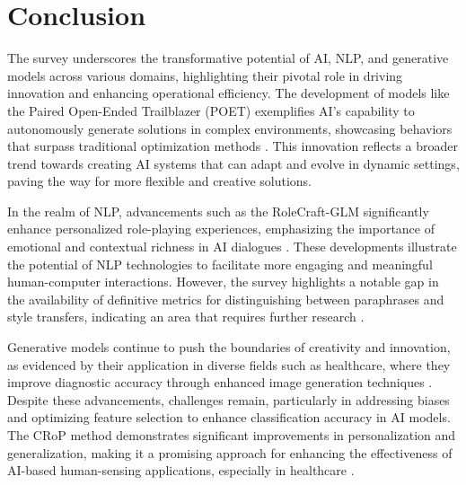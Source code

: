 \section{Conclusion} \label{sec:Conclusion}





The survey underscores the transformative potential of AI, NLP, and generative models across various domains, highlighting their pivotal role in driving innovation and enhancing operational efficiency. The development of models like the Paired Open-Ended Trailblazer (POET) exemplifies AI's capability to autonomously generate solutions in complex environments, showcasing behaviors that surpass traditional optimization methods \cite{wang2019pairedopenendedtrailblazerpoet}. This innovation reflects a broader trend towards creating AI systems that can adapt and evolve in dynamic settings, paving the way for more flexible and creative solutions.



In the realm of NLP, advancements such as the RoleCraft-GLM significantly enhance personalized role-playing experiences, emphasizing the importance of emotional and contextual richness in AI dialogues \cite{tao2024rolecraftglmadvancingpersonalizedroleplaying}. These developments illustrate the potential of NLP technologies to facilitate more engaging and meaningful human-computer interactions. However, the survey highlights a notable gap in the availability of definitive metrics for distinguishing between paraphrases and style transfers, indicating an area that requires further research \cite{yamshchikov2020styletransferparaphraselookingsensible}.



Generative models continue to push the boundaries of creativity and innovation, as evidenced by their application in diverse fields such as healthcare, where they improve diagnostic accuracy through enhanced image generation techniques \cite{zolfaghari2023surveyautomateddetectionclassification}. Despite these advancements, challenges remain, particularly in addressing biases and optimizing feature selection to enhance classification accuracy in AI models. The CRoP method demonstrates significant improvements in personalization and generalization, making it a promising approach for enhancing the effectiveness of AI-based human-sensing applications, especially in healthcare \cite{kaur2024cropcontextwiserobuststatic}.



